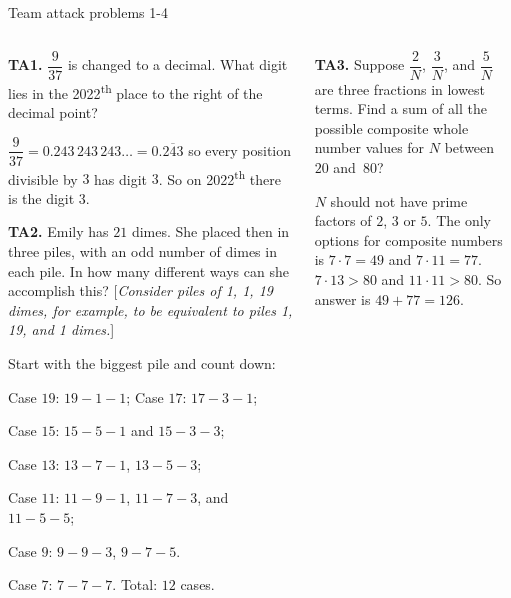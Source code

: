 \documentclass[9pt,aspectratio=169]{beamer}
\begin{document}
\begin{frame}{Team attack problems 1-4}
  \begin{columns}[T]
    \begin{column}{0.5\textwidth}
      \vspace*{-0.5\intextsep}
      \begin{problem}
        \textbf{TA1.} $\dfrac{9}{37}$ is changed to a decimal. What digit lies in the 2022\textsuperscript{th} place to the right of the decimal point?
      \end{problem}\pause
      $\dfrac{9}{37} = 0.243\,243\,243\ldots = 0.\overline{243}$ so every position divisible by $3$ has digit $3$. So on 2022\textsuperscript{th} there is the digit $\boxed{3}$.\pause

      \begin{problem}
        \textbf{TA2.} Emily has $21$ dimes. She placed then in three piles, with an odd number of dimes in each pile. In how many different ways can she accomplish this? [\emph{Consider piles of 1, 1, 19 dimes, for example, to be equivalent to piles 1, 19, and 1 dimes.}]
      \end{problem}\pause
      Start with the biggest pile and count down:
      
      Case $19$: $19-1-1$;
      Case $17$: $17-3-1$;

      Case $15$: $15-5-1$ and $15-3-3$;

      Case $13$: $13-7-1$, $13-5-3$;

      Case $11$: $11-9-1$, $11-7-3$, and $11-5-5$;

      Case $9$: $9-9-3$, $9-7-5$.

      Case $7$: $7-7-7$.
      Total: $\boxed{12}$ cases.\pause
    \end{column}
    \begin{column}{0.5\textwidth}
      \vspace*{-0.5\intextsep}
      \begin{problem}
        \textbf{TA3.} Suppose $\dfrac{2}{N}$, $\dfrac{3}{N}$, and $\dfrac{5}{N}$ are three fractions in lowest terms. Find a sum of all the possible composite whole number values for $N$ between $20$ and~$80$?
      \end{problem}\pause
      $N$ should not have prime factors of $2$, $3$ or $5$. The only options for composite numbers is $7 \cdot 7=49$ and $7 \cdot 11=77$. $7 \cdot 13 > 80$ and $11 \cdot 11 > 80$. So answer is $49 + 77 = \boxed{126}$.\pause


\end{column}
\end{columns}
\end{frame}
\end{document}
